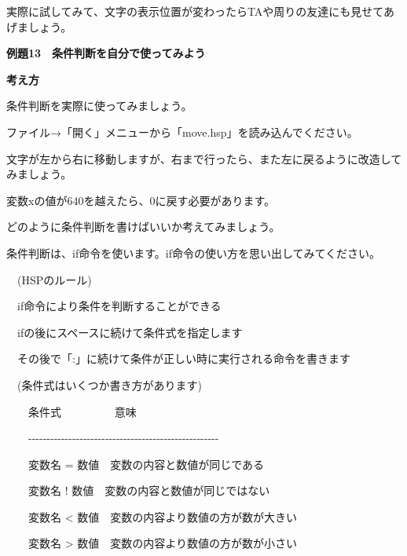 \documentclass[a4paper,dvipdfmx]{jarticle}
\newcommand\textstyleqwerty[1]{#1}
\begin{document}
実際に試してみて、文字の表示位置が変わったらTAや周りの友達にも見せてあげましょう。


\bigskip


\bigskip


\bigskip

\textstyleqwerty{\textbf{例題13　条件判断を自分で使ってみよう}}


\bigskip

{\bfseries
考え方}


\bigskip

条件判断を実際に使ってみましょう。

ファイル→「開く」メニューから「move.hsp」を読み込んでください。

文字が左から右に移動しますが、右まで行ったら、また左に戻るように改造してみましょう。

変数xの値が640を越えたら、0に戻す必要があります。

どのように条件判断を書けばいいか考えてみましょう。


\bigskip

条件判断は、if命令を使います。if命令の使い方を思い出してみてください。


\bigskip

\ \ (HSPのルール)


\bigskip

\ \ if命令により条件を判断することができる

\ \ ifの後にスペースに続けて条件式を指定します

\ \ その後で「:」に続けて条件が正しい時に実行される命令を書きます


\bigskip

\ \ (条件式はいくつか書き方があります)


\bigskip

\ \ \ \ 条件式 \ \ \ \ \ \ \ \ \ 意味

\ \ \ \ {}-{}-{}-{}-{}-{}-{}-{}-{}-{}-{}-{}-{}-{}-{}-{}-{}-{}-{}-{}-{}-{}-{}-{}-{}-{}-{}-{}-{}-{}-{}-{}-{}-{}-{}-{}-{}-{}-{}-{}-{}-{}-{}-{}-{}-{}-{}-{}-{}-{}-{}-{}-

\ \ \ \ 変数名 =
数値\ \ 変数の内容と数値が同じである

\ \ \ \ 変数名 !
数値\ \ 変数の内容と数値が同じではない

\ \ \ \ 変数名 {\textless}
数値\ \ 変数の内容より数値の方が数が大きい

\ \ \ \ 変数名 {\textgreater}
数値\ \ 変数の内容より数値の方が数が小さい



\bigskip
\end{document}
